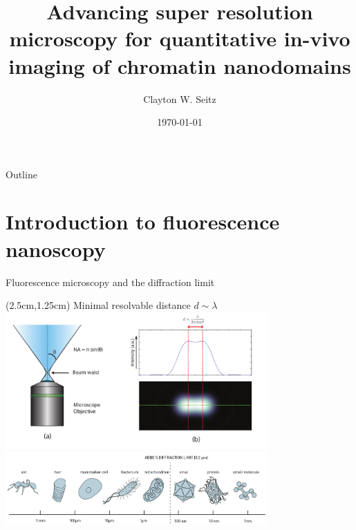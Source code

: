 \documentclass{beamer}					%
\title{Advancing super resolution microscopy for quantitative in-vivo imaging of chromatin nanodomains}	%
\author{Clayton W. Seitz}								%
\date{\today}									%
\begin{document}
\begin{frame}
  \titlepage
\end{frame}

\begin{frame}{Outline}
    \tableofcontents
\end{frame}



%

\section{Introduction to fluorescence nanoscopy}

\begin{frame}{Fluorescence microscopy and the diffraction limit}

\begin{textblock*}{9cm}(2.5cm,1.25cm)
Minimal resolvable distance $d \sim \lambda$
\includegraphics[width=10cm]{media/Limit}
\includegraphics[width=10cm]{media/Scale}
\end{textblock*}

\end{frame}
\end{document}
